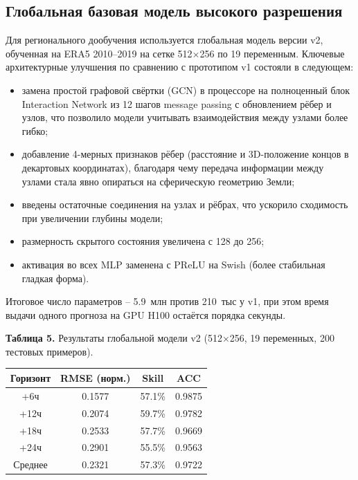 \documentclass[14pt,a4paper]{extarticle}
\newcounter{none}
\numberwithin{table}{section}
\numberwithin{figure}{section}
\numberwithin{equation}{section}
\begin{document}
\subsection{Глобальная базовая модель высокого разрешения}\label{ux433ux43bux43eux431ux430ux43bux44cux43dux430ux44f-ux431ux430ux437ux43eux432ux430ux44f-ux43cux43eux434ux435ux43bux44c-ux432ux44bux441ux43eux43aux43eux433ux43e-ux440ux430ux437ux440ux435ux448ux435ux43dux438ux44f}

Для регионального дообучения используется глобальная модель версии v2,
обученная на ERA5 2010--2019 на сетке 512$\times$256 по 19 переменным.
Ключевые архитектурные улучшения по сравнению с прототипом v1 состояли в
следующем:
\begin{itemize}
\item замена простой графовой свёртки (GCN) в процессоре на
полноценный блок Interaction Network из 12 шагов message passing с
обновлением рёбер и узлов, что позволило модели учитывать взаимодействия
между узлами более гибко;
\item добавление 4-мерных признаков рёбер (расстояние и 3D-положение
концов в декартовых координатах), благодаря чему передача информации
между узлами стала явно опираться на сферическую геометрию Земли;
\item введены остаточные соединения на узлах и рёбрах, что ускорило
сходимость при увеличении глубины модели;
\item размерность скрытого состояния увеличена с 128 до 256;
\item активация во всех MLP заменена с PReLU на Swish (более
стабильная гладкая форма).
\end{itemize}
Итоговое число параметров -- 5.9~млн против 210~тыс у v1, при этом
время выдачи одного прогноза на GPU H100 остаётся порядка секунды.

\textbf{Таблица 5.} Результаты глобальной модели v2 (512×256, 19
переменных, 200 тестовых примеров).

{\def\LTcaptype{none} %
\begin{longtable}[]{@{}cccc@{}}
\toprule\noalign{}
Горизонт & RMSE (норм.) & Skill & ACC \\
\midrule\noalign{}
\endhead
\bottomrule\noalign{}
\endlastfoot
+6ч & 0.1577 & 57.1\% & 0.9875 \\
+12ч & 0.2074 & 59.7\% & 0.9782 \\
+18ч & 0.2533 & 57.7\% & 0.9669 \\
+24ч & 0.2901 & 55.5\% & 0.9563 \\
Среднее & 0.2321 & 57.3\% & 0.9722 \\
\end{longtable}
}
\end{document}
